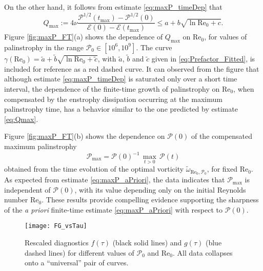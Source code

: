\documentclass[11pt]{article}
\def\E{{\mathcal{E}}}
\def\P{{\mathcal{P}}}
\newcommand{\Reyn}{\textrm{Re}}
\newcommand{\twRP}{\widetilde{\omega}_{\Reyn_0,\P_0}}
\begin{document}
On the other hand, it follows from estimate \eqref{eq:maxP_timeDep} that
\begin{equation}\label{eq:Qmax}
Q_{\max} :=  4\nu\frac{\P^{1/2}(t_{\max}) - \P^{1/2}(0)}{\E(0) - \E(t_{\max})} \leq
a + b\sqrt{\ln \Reyn_0 + c}.
\end{equation}
Figure \ref{fig:maxP_FT}(a) shows the dependence of $Q_{\max}$ on $\Reyn_0$, for values of palinstrophy in the range $\P_0 \in [10^6,10^9]$. The curve $\gamma(\Reyn_0) = \tilde{a} +\tilde{b}\sqrt{\ln\Reyn_0 + \tilde{c}}$, with $\tilde{a}$, $\tilde{b}$ and $\tilde{c}$ given in \eqref{eq:Prefactor_Fitted}, is included for reference as a red dashed curve. It can observed from the figure that although estimate \eqref{eq:maxP_timeDep} is saturated only over a short time interval, the dependence of the finite-time growth of palinstrophy on $\Reyn_0$, when compensated by the enstrophy dissipation occurring at the maximum palinstrophy time, has a  behavior similar to the one predicted by estimate \eqref{eq:Qmax}.

Figure \ref{fig:maxP_FT}(b) shows the dependence on $\P(0)$ of the compensated maximum palinstrophy
\begin{equation}
\P_{\max} = \P(0)^{-1}\,\mathop{\max}_{t > 0} \, \P(t)
\end{equation}
obtained from the time evolution of the optimal vorticity $\twRP$, for fixed $\Reyn_0$.
As expected from estimate \eqref{eq:maxP_aPriori}, the data indicates that $\P_{\max}$ is independent of $\P(0)$, with its value depending only on the initial Reynolds number $\Reyn_0$.
These results provide compelling evidence supporting the sharpness of the \emph{a priori} finite-time estimate \eqref{eq:maxP_aPriori} with respect to $\P(0)$.

\begin{figure}
\linespread{1.1}
\begin{center}
\texttt{[image: FG\_vsTau]}
\caption[Diagnostics $f(\tau)$ and $g(\tau)$]{
Rescaled diagnostics $f(\tau)$ (black solid lines) and $g(\tau)$ (blue dashed lines) for different values of $\P_0$ and $\Reyn_0$. All data collapses onto a ``universal'' pair of curves.} 
\label{fig:maxP_FandG}
\end{center}
\end{figure}
\end{document}
